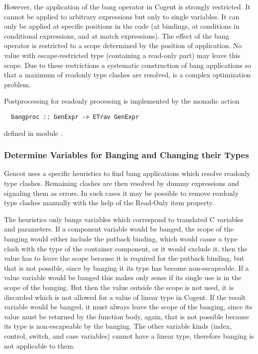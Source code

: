 However, the application of the bang operator in Cogent is strongly restricted. It cannot be applied to arbitrary expressions
but only to single variables. It can only be applied at specific positions in the code (at bindings, at conditions in conditional
expressions, and at match expressions). The effect of the bang operator is restricted to a scope determined by the position of
application. No value with escape-restricted type (containing a read-only part) may leave this scope. Due to these restrictions
a systematic construction of bang applications so that a maximum of readonly type clashes are resolved, is a complex optimization
problem.

Postprocessing for readonly processing is implemented by the monadic action
\begin{verbatim}
  bangproc :: GenExpr -> ETrav GenExpr
\end{verbatim}
defined in module .

\subsubsection{Determine Variables for Banging and Changing their Types}

Gencot uses a specific heuristics to find bang applications which resolve readonly type clashes. Remaining clashes are then
resolved by dummy expressions and signaling them as errors. In such cases it may be possible to remove readonly type clashes
manually with the help of the Read-Only item property.

The heuristics only bangs variables which correspond to translated C variables and parameters. If a component variable would
be banged, the scope of the banging would either include the putback binding, which would cause a type clash with the type of
the container component, or it would exclude it, then the value has to leave the scope because it is required for the putback
binding, but that is not possible, since by banging it its type has become non-escapeable. If a value variable would be banged
this makes only sense if its single use is in the scope of the banging. But then the value outside the scope is not used, it
is discarded which is not allowed for a value of linear type in Cogent. If the result variable would be banged, it must always
leave the scope of the banging, since its value must be returned by the function body, again, that is not possible because its
type is non-escapeable by the banging. The other variable kinds (index, control, switch, and case variables) cannot have a linear
type, therefore banging is not applicable to them.

